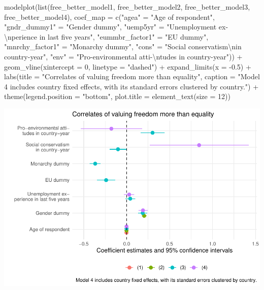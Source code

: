 \documentclass[
]{article}
\newenvironment{Shaded}{\begin{snugshade}}{\end{snugshade}}
\newcommand{\AttributeTok}[1]{\textcolor[rgb]{0.77,0.63,0.00}{#1}}
\newcommand{\DecValTok}[1]{\textcolor[rgb]{0.00,0.00,0.81}{#1}}
\newcommand{\FloatTok}[1]{\textcolor[rgb]{0.00,0.00,0.81}{#1}}
\newcommand{\FunctionTok}[1]{\textcolor[rgb]{0.00,0.00,0.00}{#1}}
\newcommand{\NormalTok}[1]{#1}
\newcommand{\OtherTok}[1]{\textcolor[rgb]{0.56,0.35,0.01}{#1}}
\newcommand{\SpecialCharTok}[1]{\textcolor[rgb]{0.00,0.00,0.00}{#1}}
\newcommand{\StringTok}[1]{\textcolor[rgb]{0.31,0.60,0.02}{#1}}
\begin{document}
\begin{Shaded}
\begin{Highlighting}[]
\FunctionTok{modelplot}\NormalTok{(}\FunctionTok{list}\NormalTok{(free\_better\_model1, free\_better\_model2, }
\NormalTok{               free\_better\_model3, free\_better\_model4),}
               \AttributeTok{coef\_map =} \FunctionTok{c}\NormalTok{(}\StringTok{"agea"} \OtherTok{=} \StringTok{"Age of respondent"}\NormalTok{,}
                            \StringTok{"gndr\_dummy1"} \OtherTok{=} \StringTok{"Gender dummy"}\NormalTok{, }
                            \StringTok{"uemp5yr"} \OtherTok{=} \StringTok{"Unemployment ex{-}}\SpecialCharTok{\textbackslash{}n}\StringTok{perience in last five years"}\NormalTok{,}
                            \StringTok{"eummbr\_factor1"} \OtherTok{=} \StringTok{"EU dummy"}\NormalTok{, }
                            \StringTok{"mnrchy\_factor1"} \OtherTok{=} \StringTok{"Monarchy dummy"}\NormalTok{,}
                            \StringTok{"cons"} \OtherTok{=} \StringTok{"Social conservatism}\SpecialCharTok{\textbackslash{}n}\StringTok{in country{-}year"}\NormalTok{, }
                            \StringTok{"env"} \OtherTok{=} \StringTok{"Pro{-}environmental atti{-}}\SpecialCharTok{\textbackslash{}n}\StringTok{tudes in country{-}year"}\NormalTok{)) }\SpecialCharTok{+}
  \FunctionTok{geom\_vline}\NormalTok{(}\AttributeTok{xintercept =} \DecValTok{0}\NormalTok{, }\AttributeTok{linetype =} \StringTok{"dashed"}\NormalTok{) }\SpecialCharTok{+}
  \FunctionTok{expand\_limits}\NormalTok{(}\AttributeTok{x =} \SpecialCharTok{{-}}\FloatTok{0.5}\NormalTok{) }\SpecialCharTok{+}
  \FunctionTok{labs}\NormalTok{(}\AttributeTok{title =} \StringTok{"Correlates of valuing freedom more than equality"}\NormalTok{, }
       \AttributeTok{caption =} \StringTok{"Model 4 includes country fixed effects, with its standard errors clustered by country."}\NormalTok{) }\SpecialCharTok{+}
  \FunctionTok{theme}\NormalTok{(}\AttributeTok{legend.position =} \StringTok{"bottom"}\NormalTok{, }
        \AttributeTok{plot.title =} \FunctionTok{element\_text}\NormalTok{(}\AttributeTok{size =} \DecValTok{12}\NormalTok{))}
\end{Highlighting}
\end{Shaded}

\includegraphics{AVCD-Assignment3-Edenhofer_files/figure-latex/free-better-correlates-1.pdf}
\end{document}
